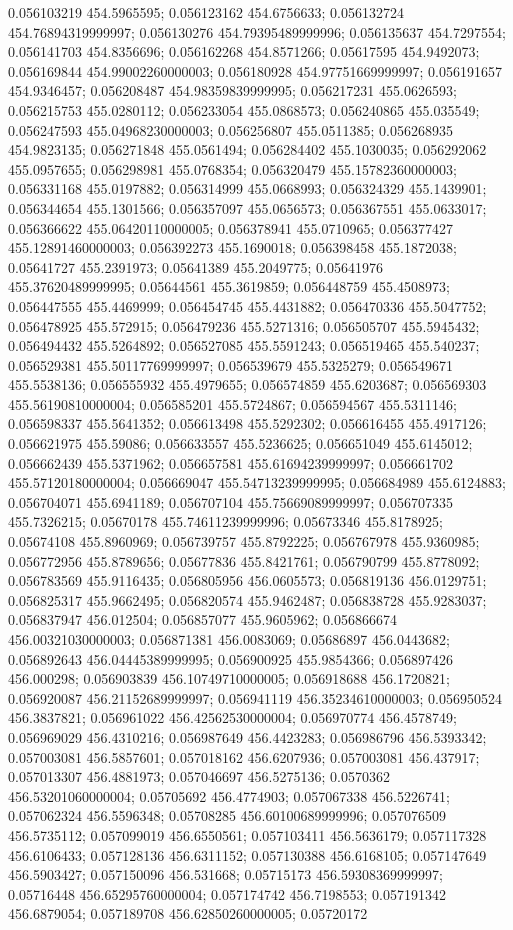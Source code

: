 0.056103219 454.5965595; 0.056123162 454.6756633; 0.056132724 454.76894319999997; 0.056130276 454.79395489999996; 0.056135637 454.7297554; 0.056141703 454.8356696; 0.056162268 454.8571266; 0.05617595 454.9492073; 0.056169844 454.99002260000003; 0.056180928 454.97751669999997; 0.056191657 454.9346457; 0.056208487 454.98359839999995; 0.056217231 455.0626593; 0.056215753 455.0280112; 0.056233054 455.0868573; 0.056240865 455.035549; 0.056247593 455.04968230000003; 0.056256807 455.0511385; 0.056268935 454.9823135; 0.056271848 455.0561494; 0.056284402 455.1030035; 0.056292062 455.0957655; 0.056298981 455.0768354; 0.056320479 455.15782360000003; 0.056331168 455.0197882; 0.056314999 455.0668993; 0.056324329 455.1439901; 0.056344654 455.1301566; 0.056357097 455.0656573; 0.056367551 455.0633017; 0.056366622 455.06420110000005; 0.056378941 455.0710965; 0.056377427 455.12891460000003; 0.056392273 455.1690018; 0.056398458 455.1872038; 0.05641727 455.2391973; 0.05641389 455.2049775; 0.05641976 455.37620489999995; 0.05644561 455.3619859; 0.056448759 455.4508973; 0.056447555 455.4469999; 0.056454745 455.4431882; 0.056470336 455.5047752; 0.056478925 455.572915; 0.056479236 455.5271316; 0.056505707 455.5945432; 0.056494432 455.5264892; 0.056527085 455.5591243; 0.056519465 455.540237; 0.056529381 455.50117769999997; 0.056539679 455.5325279; 0.056549671 455.5538136; 0.056555932 455.4979655; 0.056574859 455.6203687; 0.056569303 455.56190810000004; 0.056585201 455.5724867; 0.056594567 455.5311146; 0.056598337 455.5641352; 0.056613498 455.5292302; 0.056616455 455.4917126; 0.056621975 455.59086; 0.056633557 455.5236625; 0.056651049 455.6145012; 0.056662439 455.5371962; 0.056657581 455.61694239999997; 0.056661702 455.57120180000004; 0.056669047 455.54713239999995; 0.056684989 455.6124883; 0.056704071 455.6941189; 0.056707104 455.75669089999997; 0.056707335 455.7326215; 0.05670178 455.74611239999996; 0.05673346 455.8178925; 0.05674108 455.8960969; 0.056739757 455.8792225; 0.056767978 455.9360985; 0.056772956 455.8789656; 0.05677836 455.8421761; 0.056790799 455.8778092; 0.056783569 455.9116435; 0.056805956 456.0605573; 0.056819136 456.0129751; 0.056825317 455.9662495; 0.056820574 455.9462487; 0.056838728 455.9283037; 0.056837947 456.012504; 0.056857077 455.9605962; 0.056866674 456.00321030000003; 0.056871381 456.0083069; 0.05686897 456.0443682; 0.056892643 456.04445389999995; 0.056900925 455.9854366; 0.056897426 456.000298; 0.056903839 456.10749710000005; 0.056918688 456.1720821; 0.056920087 456.21152689999997; 0.056941119 456.35234610000003; 0.056950524 456.3837821; 0.056961022 456.42562530000004; 0.056970774 456.4578749; 0.056969029 456.4310216; 0.056987649 456.4423283; 0.056986796 456.5393342; 0.057003081 456.5857601; 0.057018162 456.6207936; 0.057003081 456.437917; 0.057013307 456.4881973; 0.057046697 456.5275136; 0.0570362 456.53201060000004; 0.05705692 456.4774903; 0.057067338 456.5226741; 0.057062324 456.5596348; 0.05708285 456.60100689999996; 0.057076509 456.5735112; 0.057099019 456.6550561; 0.057103411 456.5636179; 0.057117328 456.6106433; 0.057128136 456.6311152; 0.057130388 456.6168105; 0.057147649 456.5903427; 0.057150096 456.531668; 0.05715173 456.59308369999997; 0.05716448 456.65295760000004; 0.057174742 456.7198553; 0.057191342 456.6879054; 0.057189708 456.62850260000005; 0.05720172 